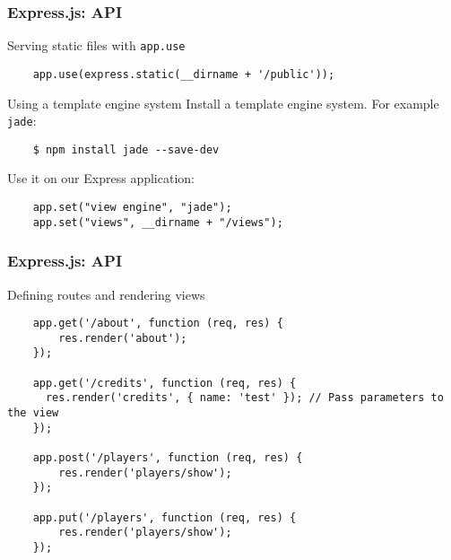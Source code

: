 \begin{frame}[fragile]
  \frametitle{Express.js: API}

  \begin{block}{Serving static files with \texttt{app.use}}
    {\tiny
    \begin{verbatim}
    app.use(express.static(__dirname + '/public'));
    \end{verbatim}
    }
  \end{block}

  \pause

  \begin{block}{Using a template engine system}
    Install a template engine system. For example \texttt{jade}:
    {\tiny
    \begin{verbatim}
    $ npm install jade --save-dev
    \end{verbatim}
    }
    Use it on our Express application:
    {\tiny
    \begin{verbatim}
    app.set("view engine", "jade");
    app.set("views", __dirname + "/views");
    \end{verbatim}
    }
  \end{block}

\end{frame}

\begin{frame}[fragile]
  \frametitle{Express.js: API}

  \begin{block}{Defining routes and rendering views}
    {\tiny
    \begin{verbatim}
    app.get('/about', function (req, res) {
        res.render('about');
    });

    app.get('/credits', function (req, res) {
      res.render('credits', { name: 'test' }); // Pass parameters to the view
    });

    app.post('/players', function (req, res) {
        res.render('players/show');
    });

    app.put('/players', function (req, res) {
        res.render('players/show');
    });
    \end{verbatim}
    }
  \end{block}
\end{frame}

